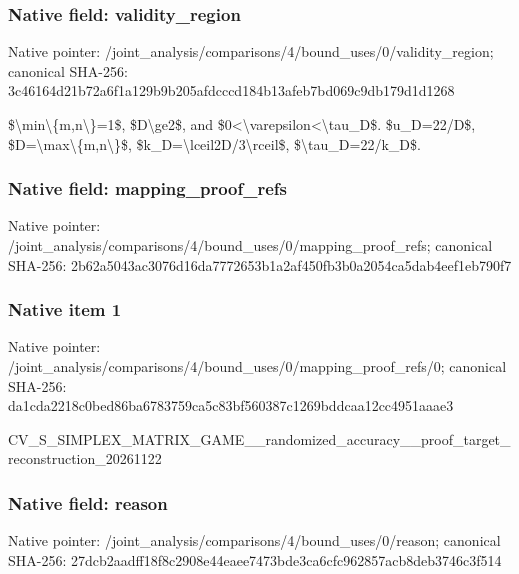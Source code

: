 \documentclass[10pt,a4paper]{article}
\begin{document}
\subsubsection{Native field: validity\_region}


Native pointer: /joint\_analysis/comparis\allowbreak{}ons/4/bound\_uses/0/valid\allowbreak{}ity\_region; canonical SHA-256: 3c46164d21b72a6f1a129b9b\allowbreak{}205afdcccd184b13afeb7bd0\allowbreak{}69c9db179d1d1268


\$\textbackslash{}min\textbackslash{}\{m,n\textbackslash{}\}=1\$, \$D\textbackslash{}ge2\$, and \$0<\textbackslash{}varepsilon<\textbackslash{}tau\_D\$. \$u\_D=22/D\$, \$D=\textbackslash{}max\textbackslash{}\{m,n\textbackslash{}\}\$, \$k\_D=\textbackslash{}lceil2D/3\textbackslash{}rceil\$, \$\textbackslash{}tau\_D=22/k\_D\$.


\subsubsection{Native field: mapping\_proof\_refs}


Native pointer: /joint\_analysis/comparis\allowbreak{}ons/4/bound\_uses/0/mappi\allowbreak{}ng\_proof\_refs; canonical SHA-256: 2b62a5043ac3076d16da7772\allowbreak{}653b1a2af450fb3b0a2054ca\allowbreak{}5dab4eef1eb790f7



\subsubsection{Native item 1}


Native pointer: /joint\_analysis/comparis\allowbreak{}ons/4/bound\_uses/0/mappi\allowbreak{}ng\_proof\_refs/0; canonical SHA-256: da1cda2218c0bed86ba67837\allowbreak{}59ca5c83bf560387c1269bdd\allowbreak{}caa12cc4951aaae3


CV\_S\_SIMPLEX\_MATRIX\_GAME\allowbreak{}\_\_randomized\_accuracy\_\_p\allowbreak{}roof\_target\_reconstructi\allowbreak{}on\_20261122


\subsubsection{Native field: reason}


Native pointer: /joint\_analysis/comparis\allowbreak{}ons/4/bound\_uses/0/reaso\allowbreak{}n; canonical SHA-256: 27dcb2aadff18f8c2908e44e\allowbreak{}aee7473bde3ca6cfc962857a\allowbreak{}cb8deb3746c3f514
\end{document}
